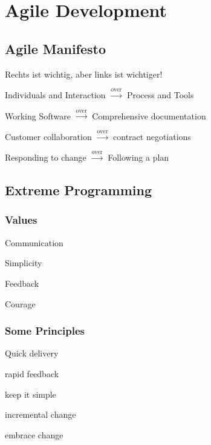 \chapter{Agile Development}

\section{Agile Manifesto}

Rechts ist wichtig, aber links ist wichtiger!
\begin{compactitem}
    \item Individuals and Interaction $\xrightarrow{\text{over}}$ Process and Tools
    \item Working Software $\xrightarrow{\text{over}}$ Comprehensive documentation
    \item Customer collaboration $\xrightarrow{\text{over}}$ contract negotiations
    \item Responding to change $\xrightarrow{\text{over}}$ Following a plan
\end{compactitem}

\section{Extreme Programming}

\subsection{Values}
\begin{compactitem}
    \item Communication
    \item Simplicity
    \item Feedback
    \item Courage
\end{compactitem}
\subsection{Some Principles}
\begin{compactitem}
    \item Quick delivery
    \item rapid feedback
    \item keep it simple
    \item incremental change
    \item embrace change
\end{compactitem}
